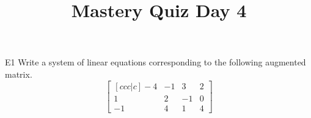 \documentclass{sbgLAquiz}
\title{Mastery Quiz Day 4 }
\begin{document}
\begin{problem}{E1}
Write a system of linear equations corresponding to the following
augmented matrix.
\[
\begin{bmatrix}[ccc|c]
-4 & -1 & 3 & 2  \\
1 & 2 & -1 & 0 \\
-1 & 4 & 1 & 4
\end{bmatrix}
\]
\end{problem}
\end{document}
